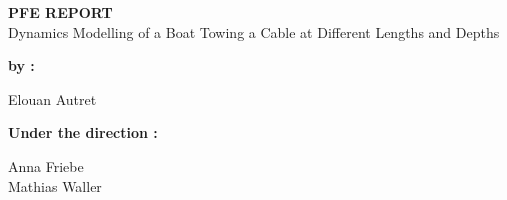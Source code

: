 \begingroup
\thispagestyle{empty}
\begin{center}
\vspace*{1cm}
{\LARGE \textsc{\textbf{PFE REPORT}}}\\
\vspace*{2cm}
{\Large Dynamics Modelling of a Boat Towing a Cable at Different Lengths and Depths}\par %
\end{center}
\vspace*{2cm}

\textbf{by :} 

\begin{center}
{
\Large
Elouan Autret\\
}
\end{center}

\vspace*{1cm}

{\textbf{Under the direction :}}\\
\begin{center}
{\Large
Anna Friebe\\
Mathias Waller\\
}


\end{center}
\endgroup




